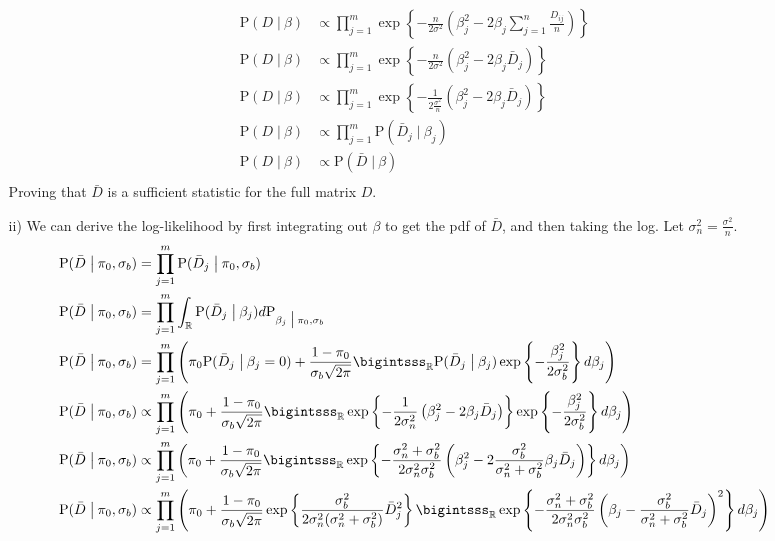 \documentclass[11pt]{article}
\newcommand{\R}{\mathbb{R}}
\newcommand{\p}{\mathrm{P}}
\newcommand{\st}{ \; \big | \:}
\theoremstyle{definition}
\begin{document}
\begin{itemize}
\begin{itemize}
\begin{align*}
                    \p(D\st\beta) &\propto \prod_{j=1}^m \exp\left\{-\frac{n}{2\sigma^2}\left(\beta_j^2-2\beta_j\sum_{j=1}^n\frac{D_{ij}}{n}\right)\right\} \\
                    \p(D\st\beta) &\propto \prod_{j=1}^m \exp\left\{-\frac{n}{2\sigma^2}\left(\beta_j^2-2\beta_j\bar D_{j}\right)\right\} \\
                    \p(D\st\beta) &\propto \prod_{j=1}^m \exp\left\{-\frac{1}{2\frac{\sigma^2}{n}}\left(\beta_j^2-2\beta_j\bar D_{j}\right)\right\} \\
                    \p(D\st\beta) &\propto \prod_{j=1}^m \p(\bar D_j \st \beta_j) \\
                    \p(D\st\beta) &\propto \p(\bar D \st \beta) \\
                \end{align*}
                Proving that $\bar D$ is a sufficient statistic for the full matrix $D$.
            \item[ii)]
                We can derive the log-likelihood by first integrating out $\beta$ to get the pdf of $\bar D$, and then taking the log. Let $\sigma_n^2 = \frac{\sigma^2}{n}$.
                \begin{align*}
                    \p(\bar D\st \pi_0,\sigma_b) &= \prod_{j=1}^m \p(\bar D_j\st \pi_0,\sigma_b)\\
                    \p(\bar D\st \pi_0,\sigma_b) &= \prod_{j=1}^m\int_\R \p(\bar D_j\st \beta_j) d\p_{\beta_j \st \pi_0,\sigma_b}\\
                    \p(\bar D\st \pi_0,\sigma_b) &= \prod_{j=1}^m\left(\pi_0\p(\bar D_j\st \beta_j=0) + \frac{1-\pi_0}{\sigma_b\sqrt{2\pi}}\bigintsss_\R \p(\bar D_j\st \beta_j)\exp\left\{-\frac{\beta_j^2}{2\sigma_b^2}\right\}d\beta_j\right) \\
                    \p(\bar D\st \pi_0,\sigma_b) &\propto \prod_{j=1}^m\left(\pi_0 + \frac{1-\pi_0}{\sigma_b\sqrt{2\pi}}\bigintsss_\R \exp\left\{-\frac{1}{2\sigma_n^2}\left(\beta_j^2-2\beta_j\bar D_{j}\right)\right\}\exp\left\{-\frac{\beta_j^2}{2\sigma_b^2}\right\}d\beta_j\right) \\
                    \p(\bar D\st \pi_0,\sigma_b) &\propto \prod_{j=1}^m\left(\pi_0 + \frac{1-\pi_0}{\sigma_b\sqrt{2\pi}}\bigintsss_\R \exp\left\{-\frac{\sigma_n^2+\sigma_b^2}{2\sigma_n^2\sigma_b^2}\left(\beta_j^2-2\frac{\sigma_b^2}{\sigma_n^2+\sigma_b^2}\beta_j\bar D_{j}\right)\right\}d\beta_j\right)\\
                    \p(\bar D\st \pi_0,\sigma_b) &\propto \prod_{j=1}^m\left(\pi_0 + \frac{1-\pi_0}{\sigma_b\sqrt{2\pi}}\exp\left\{\frac{\sigma_b^2}{2\sigma_n^2(\sigma_n^2+\sigma_b^2)}\bar D_j^2\right\}          \bigintsss_\R \exp\left\{-\frac{\sigma_n^2+\sigma_b^2}{2\sigma_n^2\sigma_b^2}\left(\beta_j-\frac{\sigma_b^2}{\sigma_n^2+\sigma_b^2}\bar D_{j}\right)^2\right\}d\beta_j\right)\\

\end{align*}
\end{itemize}
\end{itemize}
\end{document}

